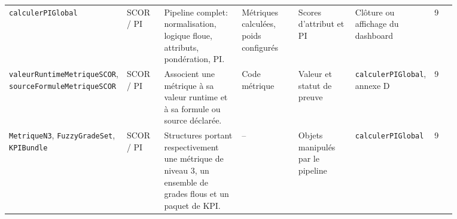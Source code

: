 \begin{landscape}
{\begin{longtable}{L{0.13\linewidth} L{0.09\linewidth} L{0.19\linewidth} L{0.14\linewidth} L{0.14\linewidth} L{0.12\linewidth} L{0.06\linewidth}}
\texttt{calculer\allowbreak PIGlobal} & SCOR / PI & Pipeline complet: normalisation, logique floue, attributs, pondération, PI. & Métriques calculées, poids configurés & Scores d'attribut et PI & Clôture ou affichage du dashboard & 9 \\
\texttt{valeur\allowbreak Runtime\allowbreak Metrique\allowbreak SCOR}, \texttt{source\allowbreak Formule\allowbreak Metrique\allowbreak SCOR} & SCOR / PI & Associent une métrique à sa valeur runtime et à sa formule ou source déclarée. & Code métrique & Valeur et statut de preuve & \texttt{calculer\allowbreak PIGlobal}, annexe D & 9 \\
\texttt{Metrique\allowbreak N3}, \texttt{Fuzzy\allowbreak Grade\allowbreak Set}, \texttt{KPIBundle} & SCOR / PI & Structures portant respectivement une métrique de niveau 3, un ensemble de grades flous et un paquet de KPI. & -- & Objets manipulés par le pipeline & \texttt{calculer\allowbreak PIGlobal} & 9 \\


\end{longtable}}
\end{landscape}
